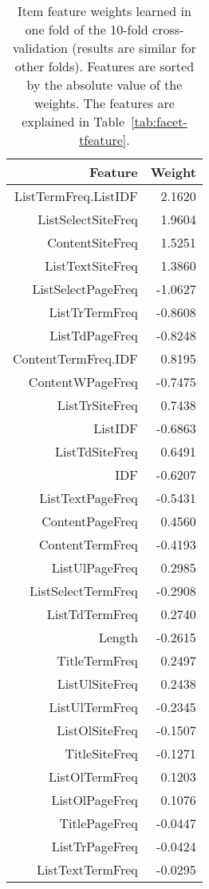\begin{table}[H]
\centering
\caption{Item feature weights learned in one fold of the 10-fold cross-validation (results are similar for other folds). Features are sorted by the absolute value of the weights. The features are explained in Table~\ref{tab:facet-tfeature}.}
\label{tab:intrinsic-tanalysis}
\begin{tabular}{|r|r|} \hline
Feature & Weight \\ \hline
ListTermFreq.ListIDF & 2.1620 \\ \hline
ListSelectSiteFreq & 1.9604 \\ \hline
ContentSiteFreq & 1.5251 \\ \hline
ListTextSiteFreq & 1.3860 \\ \hline
ListSelectPageFreq & -1.0627 \\ \hline
ListTrTermFreq & -0.8608 \\ \hline
ListTdPageFreq & -0.8248 \\ \hline
ContentTermFreq.IDF & 0.8195 \\ \hline
ContentWPageFreq & -0.7475 \\ \hline
ListTrSiteFreq & 0.7438 \\ \hline
ListIDF & -0.6863 \\ \hline
ListTdSiteFreq & 0.6491 \\ \hline
IDF & -0.6207 \\ \hline
ListTextPageFreq & -0.5431 \\ \hline
ContentPageFreq & 0.4560 \\ \hline
ContentTermFreq & -0.4193 \\ \hline
ListUlPageFreq & 0.2985 \\ \hline
ListSelectTermFreq & -0.2908 \\ \hline
ListTdTermFreq & 0.2740 \\ \hline
Length & -0.2615 \\ \hline
TitleTermFreq & 0.2497 \\ \hline
ListUlSiteFreq & 0.2438 \\ \hline
ListUlTermFreq & -0.2345 \\ \hline
ListOlSiteFreq & -0.1507 \\ \hline
TitleSiteFreq & -0.1271 \\ \hline
ListOlTermFreq & 0.1203 \\ \hline
ListOlPageFreq & 0.1076 \\ \hline
TitlePageFreq & -0.0447 \\ \hline
ListTrPageFreq & -0.0424 \\ \hline
ListTextTermFreq & -0.0295 \\ \hline
\end{tabular}
\end{table}

